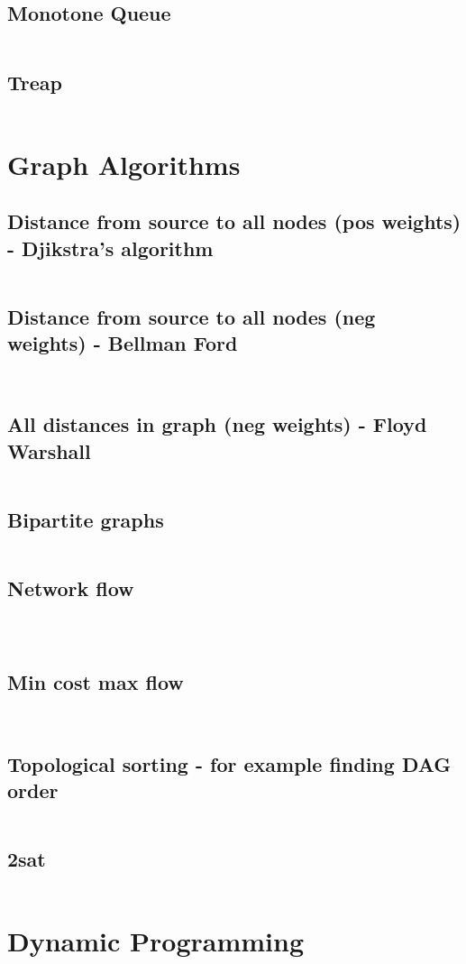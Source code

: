 \documentclass[8pt,a4paper,landscape,oneside]{amsart}
\newcommand{\codej}[1]{\inputminted[fontsize=\large,tabsize=2,baselinestretch=1]{java}{code/#1}}
\newcommand{\codec}[1]{\inputminted[fontsize=\large,tabsize=2,baselinestretch=1]{cpp}{code/#1}}
\newcommand{\codep}[1]{\inputminted[fontsize=\large,tabsize=2,baselinestretch=1]{py}{code/#1}}
\begin{document}
\begin{multicols*}{2}
\begin{large}
\subsection{Monotone Queue}
\codep{monotonequeue.py}
\subsection{Treap}
\codec{Treap.cpp}
\section{Graph Algorithms}
\subsection{Distance from source to all nodes (pos weights) - Djikstra's algorithm}
\codep{djikstra.py}
\subsection{Distance from source to all nodes (neg weights) - Bellman Ford}
\codep{bellmanford.py}
\codec{bellmanford.cpp}
\subsection{All distances in graph (neg weights) - Floyd Warshall}
\codep{floydwarshall.py}
\subsection{Bipartite graphs}
\codec{kuhns.cpp}
\subsection{Network flow}
\codec{dinic.cpp}
\codep{maxflow.py}
\codep{maxflow2.py}
\subsection{Min cost max flow}
\codep{mincostmaxflow.py}
\codej{mincostmaxflow.cpp}
\subsection{Topological sorting - for example finding DAG order}
\codep{topsort.py}
\subsection{2sat}
\codec{2sat.cpp}
\section{Dynamic Programming}

\end{large}
\end{multicols*}
\end{document}
